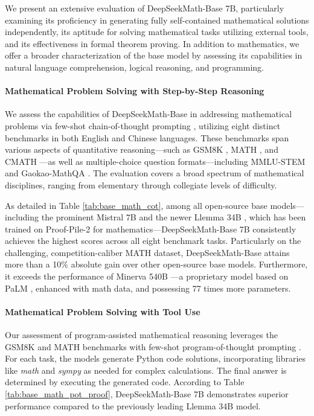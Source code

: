\begin{itemize}[topsep=0pt]
We present an extensive evaluation of DeepSeekMath-Base 7B, particularly examining its proficiency in generating fully self-contained mathematical solutions independently, its aptitude for solving mathematical tasks utilizing external tools, and its effectiveness in formal theorem proving. In addition to mathematics, we offer a broader characterization of the base model by assessing its capabilities in natural language comprehension, logical reasoning, and programming.

\paragraph{Mathematical Problem Solving with Step-by-Step Reasoning}

We assess the capabilities of DeepSeekMath-Base in addressing mathematical problems via few-shot chain-of-thought prompting \citep{cot}, utilizing eight distinct benchmarks in both English and Chinese languages. These benchmarks span various aspects of quantitative reasoning—such as GSM8K \citep{gsm8k}, MATH \citep{MATH}, and CMATH \citep{wei2023cmath}—as well as multiple-choice question formats—including MMLU-STEM \citep{mmlu} and Gaokao-MathQA \citep{agieval}. The evaluation covers a broad spectrum of mathematical disciplines, ranging from elementary through collegiate levels of difficulty.

As detailed in Table \ref{tab:base_math_cot}, among all open-source base models—including the prominent Mistral 7B \citep{mistral} and the newer Llemma 34B \citep{llemma}, which has been trained on Proof-Pile-2 \citep{llemma} for mathematics—DeepSeekMath-Base 7B consistently achieves the highest scores across all eight benchmark tasks. Particularly on the challenging, competition-caliber MATH dataset, DeepSeekMath-Base attains more than a 10\% absolute gain over other open-source base models. Furthermore, it exceeds the performance of Minerva 540B \citep{minerva}—a proprietary model based on PaLM \citep{palm}, enhanced with math data, and possessing 77 times more parameters.

\paragraph{Mathematical Problem Solving with Tool Use} Our assessment of program-assisted mathematical reasoning leverages the GSM8K and MATH benchmarks with few-shot program-of-thought prompting \citep{pot,pal}. For each task, the models generate Python code solutions, incorporating libraries like \textit{math} and \textit{sympy} as needed for complex calculations. The final answer is determined by executing the generated code. According to Table \ref{tab:base_math_pot_proof}, DeepSeekMath-Base 7B demonstrates superior performance compared to the previously leading Llemma 34B model.


\end{itemize}
